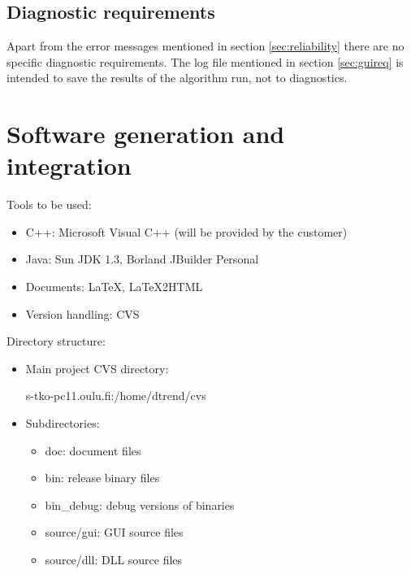 \documentclass[a4paper,11pt]{article}
\begin{document}
\subsection{Diagnostic requirements}
Apart from the error messages mentioned in section \ref{sec:reliability} there are no specific diagnostic requirements. 
The log file mentioned in section \ref{sec:guireq} is intended to save the results of the algorithm run, not to diagnostics.

\section{Software generation and integration}
Tools to be used:
\begin{itemize}
\item C++: Microsoft Visual C++ (will be provided by the customer)
\item Java: Sun JDK 1.3, Borland JBuilder Personal
\item Documents: \LaTeX, \LaTeX2HTML
\item Version handling: CVS
\end{itemize}

\noindent Directory structure:
\begin{itemize}
\item Main project CVS directory: 

s-tko-pc11.oulu.fi:/home/dtrend/cvs
\item Subdirectories:

\begin{itemize}
\item doc: document files
\item bin: release binary files
\item bin\_debug: debug versions of binaries
\item source/gui: GUI source files
\item source/dll: DLL source files
\end{itemize}
\end{itemize}
\end{document}
